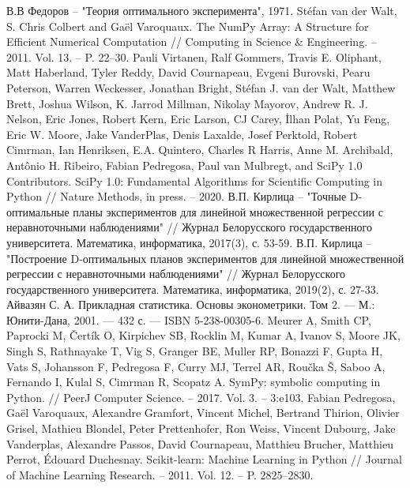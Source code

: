 \begin{thebibliography}{}
	 В.В Федоров -- "Теория оптимального эксперимента", 1971.
	 Stéfan van der Walt, S. Chris Colbert and Gaël Varoquaux. The NumPy Array: A Structure for Efficient Numerical Computation // Computing in Science \& Engineering. -- 2011. Vol. 13. -- P. 22--30.
	 Pauli Virtanen, Ralf Gommers, Travis E. Oliphant, Matt Haberland, Tyler Reddy, David Cournapeau, Evgeni Burovski, Pearu Peterson, Warren Weckesser, Jonathan Bright, Stéfan J. van der Walt, Matthew Brett, Joshua Wilson, K. Jarrod Millman, Nikolay Mayorov, Andrew R. J. Nelson, Eric Jones, Robert Kern, Eric Larson, CJ Carey, İlhan Polat, Yu Feng, Eric W. Moore, Jake VanderPlas, Denis Laxalde, Josef Perktold, Robert Cimrman, Ian Henriksen, E.A. Quintero, Charles R Harris, Anne M. Archibald, Antônio H. Ribeiro, Fabian Pedregosa, Paul van Mulbregt, and SciPy 1.0 Contributors.  SciPy 1.0: Fundamental Algorithms for Scientific Computing in Python // Nature Methods, in press. -- 2020.
	 В.П. Кирлица -- "Точные  D-оптимальные планы экспериментов для линейной множественной регрессии с неравноточными наблюдениями" // Журнал Белорусского государственного университета. Математика, информатика, 2017(3), с. 53-59.
	 В.П. Кирлица -- "Построение  D-оптимальных  планов экспериментов для линейной множественной регрессии с неравноточными наблюдениями" // Журнал Белорусского государственного университета. Математика, информатика, 2019(2), с. 27-33.
	 Айвазян С. А. Прикладная статистика. Основы эконометрики. Том 2. — М.: Юнити-Дана, 2001. — 432 с. — ISBN 5-238-00305-6.
	 Meurer A, Smith CP, Paprocki M, Čertík O, Kirpichev SB, Rocklin M, Kumar A, Ivanov S, Moore JK, Singh S, Rathnayake T, Vig S, Granger BE, Muller RP, Bonazzi F, Gupta H, Vats S, Johansson F, Pedregosa F, Curry MJ, Terrel AR, Roučka Š, Saboo A, Fernando I, Kulal S, Cimrman R, Scopatz A. SymPy: symbolic computing in Python. //  PeerJ Computer Science. -- 2017.  Vol. 3. -- 3:e103.
	 Fabian Pedregosa, Gaël Varoquaux, Alexandre Gramfort, Vincent Michel, Bertrand Thirion, Olivier Grisel, Mathieu Blondel, Peter Prettenhofer, Ron Weiss, Vincent Dubourg, Jake Vanderplas, Alexandre Passos, David Cournapeau, Matthieu Brucher, Matthieu Perrot, Édouard Duchesnay. Scikit-learn: Machine Learning in Python // Journal of Machine Learning Research. -- 2011. Vol. 12. -- P.  2825--2830.
\end{thebibliography}

